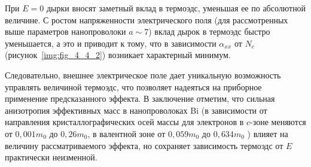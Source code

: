При $E=0$ дырки вносят заметный вклад в термоэдс, уменьшая ее по абсолютной величине. С ростом напряженности электрического поля (для рассмотренных выше параметров нанопроволоки $a\sim 7$) вклад дырок в термоэдс быстро уменьшается, а это и приводит к тому, что в зависимости $\alpha_{xx} $ от $N_c $ (рисунок~\ref{img:fig_4_4_2}) возникает характерный минимум.
 
Следовательно, внешнее электрическое поле дает уникальную возможность управлять величиной термоэдс, что позволяет надеяться  на приборное применение предсказанного эффекта. В заключение отметим, что сильная анизотропия эффективных масс в нанопроволоках Bi (в зависимости от направления кристаллографических осей массы для электронов в $c$-зоне меняются от $0,001 m_0 $ до $0,26 m_0 $, в валентной зоне от $0,059m_0 $ до $0,634m_0 $ \cite{Levin2009a}) влияет на величину рассматриваемого эффекта, но сохраняет зависимость термоэдс от $E$ практически неизменной.
